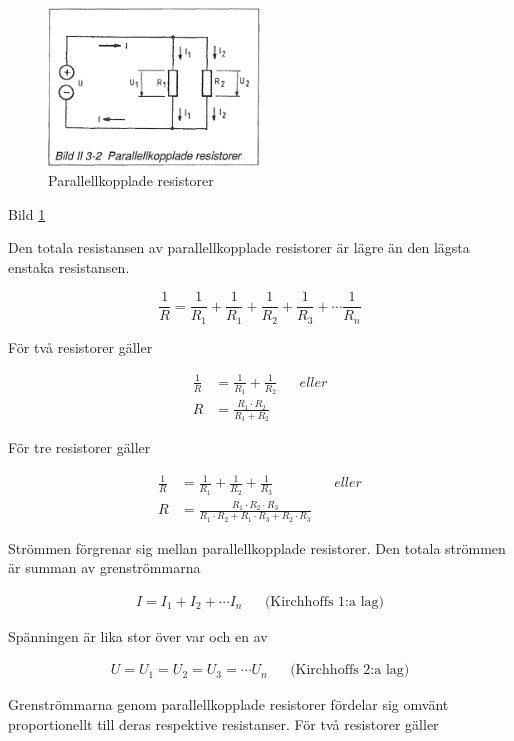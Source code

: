 \begin{figure}
\includegraphics[width=0.5\textwidth]{images/bild_2_3-02}
\caption{Parallellkopplade resistorer}
\label{fig:BildII3-02}
\end{figure}

Bild \ref{fig:BildII3-02}

Den totala resistansen av parallellkopplade resistorer är lägre än den lägsta
enstaka resistansen.

\[
\frac{1}{R} = \frac{1}{R_1} + \frac{1}{R_1} +
\frac{1}{R_2} + \frac{1}{R_3} + \cdots \frac{1}{R_n}
\]

För två resistorer gäller

\begin{align*}
\frac{1}{R} &= \frac{1}{R_1} + \frac{1}{R_2} && eller \\
R &= \frac{R_1 \cdot R_2}{R_1 + R_2}
\end{align*}

För tre resistorer gäller

\begin{align*}
\frac{1}{R} &= \frac{1}{R_1} + \frac{1}{R_2} + \frac{1}{R_3} && eller \\
R &= \frac{R_1\cdot R_2\cdot R_3}{R_1\cdot R_2 + R_1\cdot R_3 + R_2\cdot R_3}
\end{align*}

Strömmen förgrenar sig mellan parallellkopplade resistorer. Den totala strömmen
är summan av grenströmmarna

\begin{align*}
  I = I_1 + I_2 + \cdots I_n && \text{(Kirchhoffs 1:a lag)}
\end{align*}

Spänningen är lika stor över var och en av

\begin{align*}
  U = U_1 = U_2 = U_3 = \cdots U_n && \text{(Kirchhoffs 2:a lag)}
\end{align*}

Grenströmmarna genom parallellkopplade resistorer fördelar sig omvänt
proportionellt till deras respektive resistanser.
För två resistorer gäller

